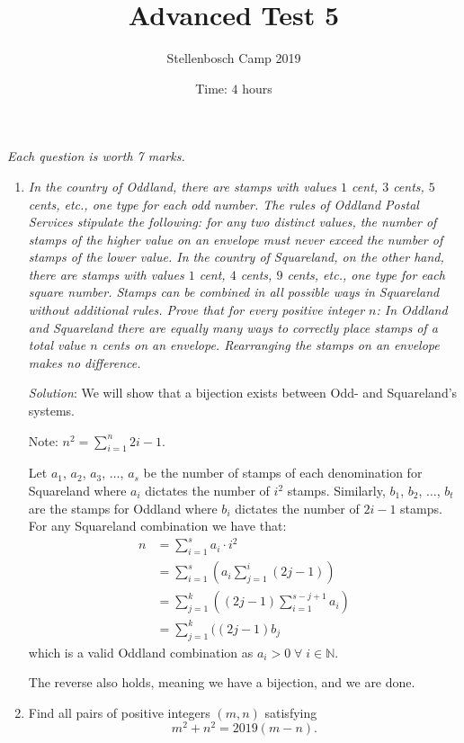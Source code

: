 \documentclass{article}
\title{Advanced Test 5}
\author{Stellenbosch Camp 2019}
\date{Time: $4$ hours}
\begin{document}
\maketitle
\thispagestyle{empty}

\hfill\textit{Each question is worth 7 marks.}

\begin{enumerate}[1.]

\item %
\textit{In the country of Oddland, there are stamps with values $1$ cent, $3$ cents, $5$ cents, etc., one type for each odd number.
The rules of Oddland Postal Services stipulate the following: for any two distinct values, the number of stamps of the higher value on an envelope must never exceed the number of stamps of the lower value.
In the country of Squareland, on the other hand, there are stamps with values $1$ cent, $4$ cents, $9$ cents, etc., one type for each square number.
Stamps can be combined in all possible ways in Squareland without additional rules.
Prove that for every positive integer $n$:
In Oddland and Squareland there are equally many ways to correctly place stamps of a total value $n$ cents on an envelope.
Rearranging the stamps on an envelope makes no difference.
}

\textit{Solution}: 
We will show that a bijection exists between Odd- and Squareland's systems.

Note: $n^2 = \sum_{i = 1}^{n} 2i - 1$.

Let $a_1$, $a_2$, $a_3$, $\dots$, $a_s$ be the number of stamps of each denomination for Squareland where $a_i$ dictates the number of $i^2$ stamps.
Similarly, $b_1$, $b_2$, $\dots$, $b_t$ are the stamps for Oddland where $b_i$ dictates the number of $2i - 1$ stamps.
For any Squareland combination we have that:
\begin{align*}
  n &= \sum_ {i = 1}^{s} a_i \cdot i^2 \\
  &= \sum_ {i = 1}^{s} (a_i \sum_{j = 1}^{i} (2j - 1) ) \\
  &= \sum_ {j = 1}^{k} ((2j - 1) \sum_{i = 1}^{s - j + 1}a_i) \\
  &= \sum_ {j = 1}^{k} ((2j - 1) b_j 
\end{align*}
which is a valid Oddland combination as $a_i > 0 \;\forall\; i \in \mathbb{N}$.

The reverse also holds, meaning we have a bijection, and we are done.


\item %
Find all pairs of positive integers $(m,n)$ satisfying
\[ m^2 +n^2 = 2019(m-n). \]


\end{enumerate}
\end{document}
